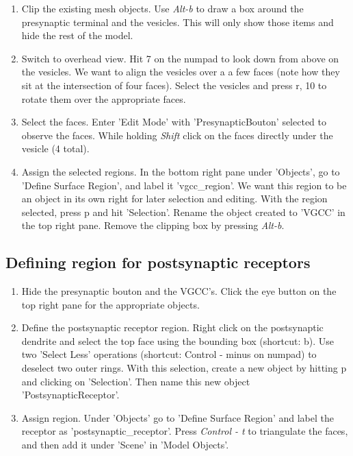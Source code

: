 \documentclass[twoside,a4paper]{refart}
\begin{document}
\begin{enumerate}
\item   Clip the existing mesh objects. Use \textit{Alt-b} to draw a box around the presynaptic terminal and the vesicles. This will only show those items and hide the rest of the model.
    
\item   Switch to overhead view. Hit 7 on the numpad to look down from above on the vesicles. We want to align the vesicles over a a few faces (note how they sit at the intersection of four faces). Select the vesicles and press r, 10 to rotate them over the appropriate faces.

\item   Select the faces. Enter 'Edit Mode' with 'PresynapticBouton' selected to observe the faces. While holding \textit{Shift} click on the faces directly under the vesicle (4 total). 

\item   Assign the selected regions. In the bottom right pane under 'Objects', go to 'Define Surface Region', and label it 'vgcc\_region'. We want this region to be an object in its own right for later selection and editing. With the region selected, press p and hit 'Selection'. Rename the object created to 'VGCC' in the top right pane. Remove the clipping box by pressing \textit{Alt-b}.
\end{enumerate}

\subsection{Defining region for postsynaptic receptors}

\begin{enumerate}
\item   Hide the presynaptic bouton and the VGCC's. Click the eye button on the top right pane for the appropriate objects.

\item   Define the postsynaptic receptor region. Right click on the postsynaptic dendrite and select the top face using the bounding box (shortcut: b). Use two 'Select Less' operations (shortcut: Control - minus on numpad) to deselect two outer rings. With this selection, create a new object by hitting p and clicking on 'Selection'. Then name this new object 'PostsynapticReceptor'.

\item   Assign region. Under 'Objects' go to 'Define Surface Region' and label the receptor as 'postsynaptic\_receptor'. Press \textit{Control - t} to triangulate the faces, and then add it under 'Scene' in 'Model Objects'.

\end{enumerate}
\end{document}
